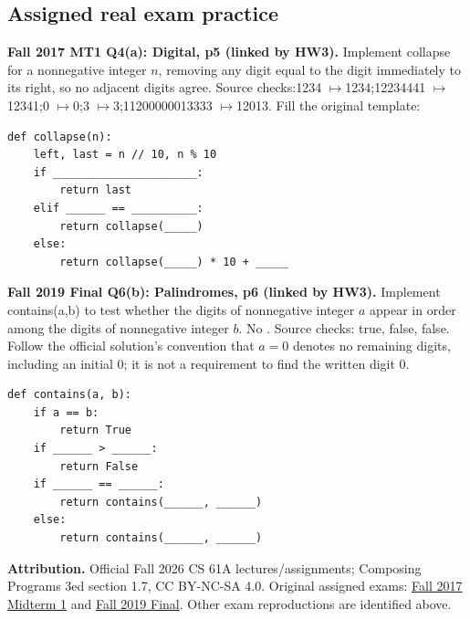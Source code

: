 \subsection{Assigned real exam practice}
\begin{prob}
\textbf{Fall 2017 MT1 Q4(a): Digital, p5 (linked by HW3).} Implement collapse for a nonnegative integer $n$, removing any digit equal to the digit immediately to its right, so no adjacent digits agree. Source checks:1234 $\mapsto$1234;12234441 $\mapsto$12341;0 $\mapsto$0;3 $\mapsto$3;11200000013333 $\mapsto$12013. Fill the original template:
\begin{lstlisting}
def collapse(n):
    left, last = n // 10, n % 10
    if ______________________:
        return last
    elif ______ == __________:
        return collapse(_____)
    else:
        return collapse(_____) * 10 + _____
\end{lstlisting}
\end{prob}
\begin{prob}
\textbf{Fall 2019 Final Q6(b): Palindromes, p6 (linked by HW3).} Implement contains(a,b) to test whether the digits of nonnegative integer $a$ appear in order among the digits of nonnegative integer $b$. No . Source checks:  true,  false,  false. Follow the official solution's convention that $a=0$ denotes no remaining digits, including an initial 0; it is not a requirement to find the written digit 0.
\begin{lstlisting}
def contains(a, b):
    if a == b:
        return True
    if ______ > ______:
        return False
    if ______ == ______:
        return contains(______, ______)
    else:
        return contains(______, ______)
\end{lstlisting}
\end{prob}

\textbf{Attribution.} Official Fall 2026 CS 61A lectures/assignments; Composing Programs 3ed section 1.7, CC BY-NC-SA 4.0. Original assigned exams: \href{https://cs61a.org/resources/fa17/mt1/61a-fa17-mt1.pdf}{Fall 2017 Midterm 1} and \href{https://cs61a.org/resources/fa19/final/61a-fa19-final.pdf}{Fall 2019 Final}. Other exam reproductions are identified above.
